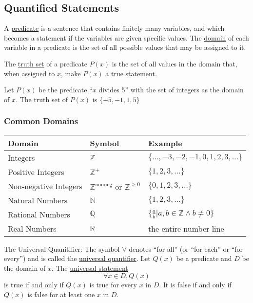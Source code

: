 \subsection{Quantified Statements}
\begin{definition}
    A \underline{predicate} is a sentence that contains finitely many variables, and which becomes a statement if the variables are given specific values. The \underline{domain} of each variable in a predicate is the set of all possible values that may be assigned to it.
\end{definition}

\begin{definition}
    The \underline{truth set} of a predicate $P(x)$ is the set of all values in the domain that, when assigned to $x$, make $P(x)$ a true statement.
\end{definition}

\begin{example}
    Let $P(x)$ be the predicate ``$x$ divides 5'' with the set of integers as the domain of $x$. The truth set of $P(x)$ is $\{-5,-1,1,5\}$
\end{example}

\subsubsection{Common Domains}
\begin{table}[H]
\begin{tabular}{|l|l|l|}
\hline
Domain & Symbol & Example \\
\hline
Integers & $\mathbb{Z}$ & $\{\dots,-3,-2,-1,0,1,2,3,\dots\}$ \\
Positive Integers & $\mathbb{Z}^+$ & $\{1,2,3,\dots\}$ \\
Non-negative Integers & $\mathbb{Z}^\text{nonneg} \text{ or } \mathbb{Z}^{\geq 0}$ & $\{0,1,2,3,\dots\}$ \\
Natural Numbers & $\mathbb{N}$ & $\{1,2,3,\dots\}$ \\
Rational Numbers & $\mathbb{Q}$ & $\{\frac{a}{b} | a,b\in\mathbb Z \land b\neq 0\}$ \\
Real Numbers & $\mathbb{R}$ & the entire number line \\
\hline
\end{tabular}
\end{table}

\begin{definition}
    The Universal Quanitifier: The symbol $\forall$ denotes ``for all'' (or ``for each'' or ``for every'') and is called the \underline{universal quantifier}. Let $Q(x)$ be a predicate and $D$ be the domain of $x$. The \underline{universal statement} $$\forall x\in D, Q(x)$$ is true if and only if $Q(x)$ is true for every $x$ in $D$. It is false if and only if $Q(x)$ is false for at least one $x$ in $D$.
\end{definition}


